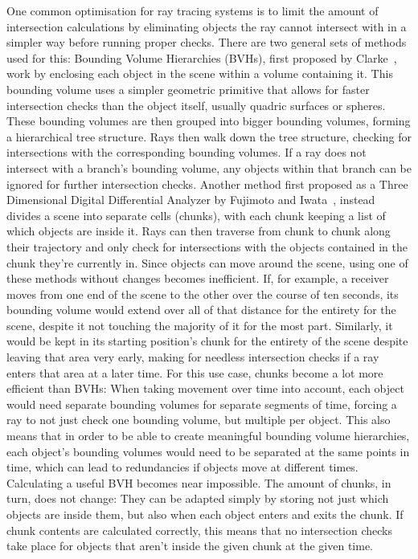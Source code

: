 One common optimisation for ray tracing systems is to limit the amount of intersection calculations by eliminating
objects the ray cannot intersect with in a simpler way before running proper checks.
There are two general sets of methods used for this:
\newline
Bounding Volume Hierarchies (BVHs), first proposed by Clarke~\cite{Cl76},
work by enclosing each object in the scene within a volume containing it.
This bounding volume uses a simpler geometric primitive that allows for faster intersection checks than the object itself,
usually quadric surfaces or spheres.
These bounding volumes are then grouped into bigger bounding volumes, forming a hierarchical tree structure.
Rays then walk down the tree structure, checking for intersections with the corresponding bounding volumes.
If a ray does not intersect with a branch's bounding volume,
any objects within that branch can be ignored for further intersection checks.
\newline
Another method first proposed as a Three Dimensional Digital Differential Analyzer by Fujimoto and Iwata~\cite{FI85},
instead divides a scene into separate cells (chunks),
with each chunk keeping a list of which objects are inside it.
Rays can then traverse from chunk to chunk along their trajectory
and only check for intersections with the objects contained in the chunk they're currently in.
\newline
Since objects can move around the scene, using one of these methods without changes becomes inefficient.
If, for example, a receiver moves from one end of the scene to the other over the course of ten seconds,
its bounding volume would extend over all of that distance for the entirety for the scene, despite it not touching
the majority of it for the most part.
Similarly, it would be kept in its starting position's chunk for the entirety of the scene despite leaving that area very early,
making for needless intersection checks if a ray enters that area at a later time.
\newline
For this use case, chunks become a lot more efficient than BVHs:
When taking movement over time into account, each object would need separate bounding volumes for separate segments of time,
forcing a ray to not just check one bounding volume, but multiple per object.
This also means that in order to be able to create meaningful bounding volume hierarchies,
each object's bounding volumes would need to be separated at the same points in time,
which can lead to redundancies if objects move at different times.
Calculating a useful BVH becomes near impossible.
\newline
The amount of chunks, in turn, does not change:
They can be adapted simply by storing not just which objects are inside them,
but also when each object enters and exits the chunk.
If chunk contents are calculated correctly,
this means that no intersection checks take place for objects that aren't inside the given chunk at the given time.

